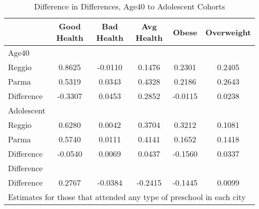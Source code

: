 \begin{table}[htbp]\centering
\caption{Difference in Differences, Age40 to Adolescent Cohorts}
\begin{tabular}{l*{5}{c}}
\hline\hline
            & Good Health&  Bad Health&  Avg Health&       Obese&  Overweight\\
\hline
Age40       &            &            &            &            &            \\
Reggio      &      0.8625&     -0.0110&      0.1476&      0.2301&      0.2405\\
Parma       &      0.5319&      0.0343&      0.4328&      0.2186&      0.2643\\
Difference  &     -0.3307&      0.0453&      0.2852&     -0.0115&      0.0238\\
\hline
Adolescent  &            &            &            &            &            \\
Reggio      &      0.6280&      0.0042&      0.3704&      0.3212&      0.1081\\
Parma       &      0.5740&      0.0111&      0.4141&      0.1652&      0.1418\\
Difference  &     -0.0540&      0.0069&      0.0437&     -0.1560&      0.0337\\
\hline
Difference  &            &            &            &            &            \\
Difference  &      0.2767&     -0.0384&     -0.2415&     -0.1445&      0.0099\\
\hline\hline
\multicolumn{6}{l}{\footnotesize Estimates for those that attended any type of preschool in each city}\\
\end{tabular}
\end{table}
